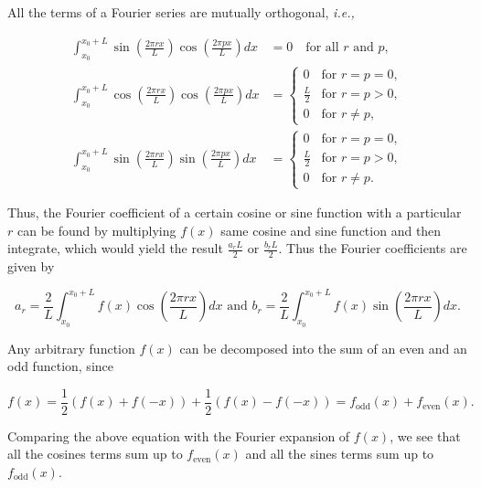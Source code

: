 \documentclass[english,a4paper,12pt]{report}
\begin{document}
All the terms of a Fourier series are mutually orthogonal, \textit{i.e.,} 

\begin{equation}
    \begin{aligned}
        \int_{x_0}^{x_0+L} \sin\left(\frac{2\pi r x}{L}\right) \cos\left(\frac{2\pi p x}{L}\right) dx &= 0 \quad \text{for all } r \text{ and } p, \\
        \int_{x_0}^{x_0+L} \cos\left(\frac{2\pi r x}{L}\right) \cos\left(\frac{2\pi p x}{L}\right) dx &=
\begin{cases} 
    0 & \text{for } r = p = 0, \\
    \frac{L}{2} & \text{for } r = p > 0, \\
    0 & \text{for } r \neq p,
\end{cases} \\
\int_{x_0}^{x_0+L} \sin\left(\frac{2\pi r x}{L}\right) \sin\left(\frac{2\pi p x}{L}\right) dx &=
\begin{cases} 
    0 & \text{for } r = p = 0, \\
    \frac{L}{2} & \text{for } r = p > 0, \\
    0 & \text{for } r \neq p.
\end{cases}
    \end{aligned}
\end{equation}

Thus, the Fourier coefficient of a certain cosine or sine function with a particular \(r\) can be found by multiplying \(f(x)\) same cosine and sine function and then integrate, which would yield the result \(\displaystyle \frac{a_{r} L}{2} \text { or } \frac{b_{r}L }{2} \). Thus the Fourier coefficients are given by 

\begin{equation}
    a_{r} = \frac{2}{L} \int_{x_0}^{x_0 + L} f(x) \cos \left( \frac{2\pi rx}{L}  \right) dx \text { and } b_{r} = \frac{2}{L} \int_{x_0 }^{x_0 + L} f(x) \sin \left( \frac{2\pi rx}{L}  \right) dx.   
\end{equation}

Any arbitrary function \(f(x)\) can be decomposed into the sum of an even and an odd function, since

\begin{equation}
    f(x) = \frac{1}{2}(f(x) + f(-x)) + \frac{1}{2} (f(x) - f(-x)) = f_{\text{odd} }(x) + f_{\text{even} }(x).
\end{equation}

Comparing the above equation with the Fourier expansion of \(f(x)\), we see that all the cosines terms sum up to \(f_{\text{even}}(x)\) and all the sines terms sum up to \(f_{\text{odd} }(x)\). 
\end{document}
